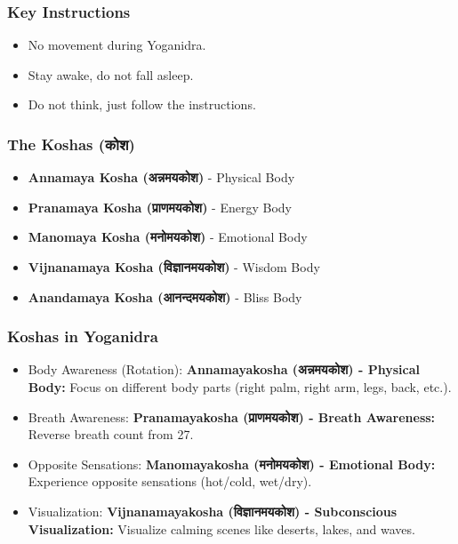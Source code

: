 \begin{frame}[fragile]\frametitle{Key Instructions}
    \begin{itemize}
        \item No movement during Yoganidra.
        \item Stay awake, do not fall asleep.
        \item Do not think, just follow the instructions.
    \end{itemize}
\end{frame}


\begin{frame}[fragile]\frametitle{The Koshas (कोश)}
    \begin{itemize}
        \item \textbf{Annamaya Kosha (अन्नमयकोश)} - Physical Body
        \item \textbf{Pranamaya Kosha (प्राणमयकोश)} - Energy Body
        \item \textbf{Manomaya Kosha (मनोमयकोश)} - Emotional Body
        \item \textbf{Vijnanamaya Kosha (विज्ञानमयकोश)} - Wisdom Body
        \item \textbf{Anandamaya Kosha (आनन्दमयकोश)} - Bliss Body
    \end{itemize}
\end{frame}

\begin{frame}[fragile]\frametitle{Koshas in Yoganidra}
    
    \begin{itemize}
        \item Body Awareness (Rotation): \textbf{Annamayakosha (अन्नमयकोश) - Physical Body:} Focus on different body parts (right palm, right arm, legs, back, etc.).
        \item Breath Awareness: \textbf{Pranamayakosha (प्राणमयकोश) - Breath Awareness:} Reverse breath count from 27.
        \item Opposite Sensations: \textbf{Manomayakosha (मनोमयकोश) - Emotional Body:} Experience opposite sensations (hot/cold, wet/dry).
        \item Visualization: \textbf{Vijnanamayakosha (विज्ञानमयकोश) - Subconscious Visualization:} Visualize calming scenes like deserts, lakes, and waves.
    \end{itemize}
\end{frame}

